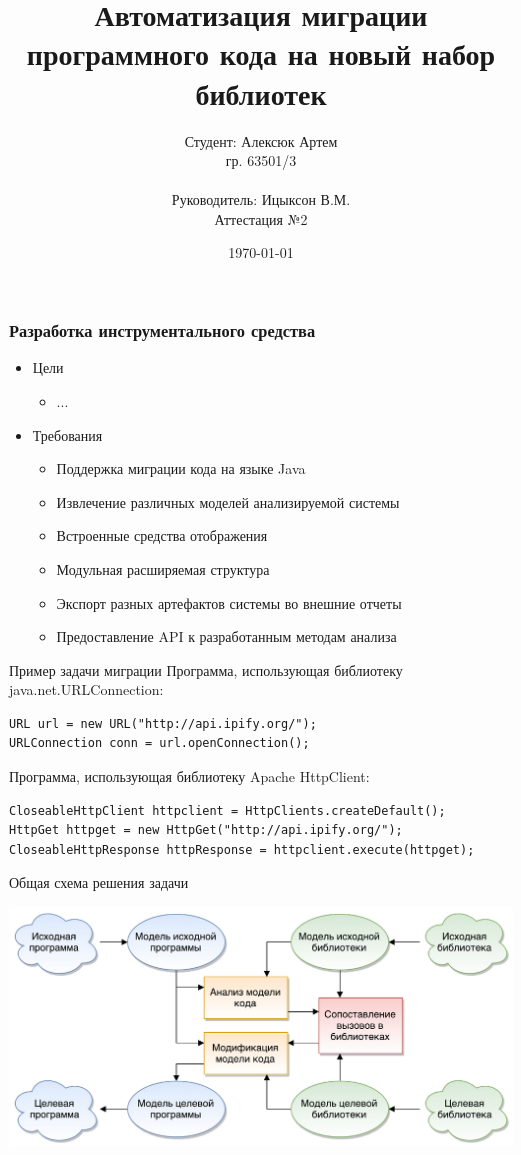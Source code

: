 \documentclass[12pt]{beamer}
\title{Автоматизация миграции программного кода на новый набор библиотек}
\author[Алексюк Артем]{
    Студент: Алексюк Артем\\
    гр. 63501/3\\ \\
    Руководитель: Ицыксон В.М.\\
    Аттестация №2
}
\date{\today}
\begin{document}
\maketitle

\begin{frame}
\frametitle{Разработка инструментального средства}

\begin{itemize}
    \item Цели
        \begin{itemize}
            \item ...
        \end{itemize}
    \item Требования
        \begin{itemize}
            \item Поддержка миграции кода на языке Java
            \item Извлечение различных моделей анализируемой системы
            \item Встроенные средства отображения
            \item Модульная расширяемая структура
            \item Экспорт разных артефактов системы во внешние отчеты
            \item Предоставление API к разработанным методам анализа
        \end{itemize}
\end{itemize}
\end{frame}

\begin{frame}[fragile]{Пример задачи миграции}
	Программа, использующая библиотеку java.net.URLConnection:
\begin{verbatim}
URL url = new URL("http://api.ipify.org/");
URLConnection conn = url.openConnection();
\end{verbatim}
	Программа, использующая библиотеку Apache HttpClient:
\begin{verbatim}
CloseableHttpClient httpclient = HttpClients.createDefault();
HttpGet httpget = new HttpGet("http://api.ipify.org/");
CloseableHttpResponse httpResponse = httpclient.execute(httpget);
\end{verbatim}
\end{frame}

\begin{frame}{Общая схема решения задачи}
	\begin{center}
		\includegraphics[width=\textwidth]{scheme.pdf}
	\end{center}
\end{frame}
\end{document}
